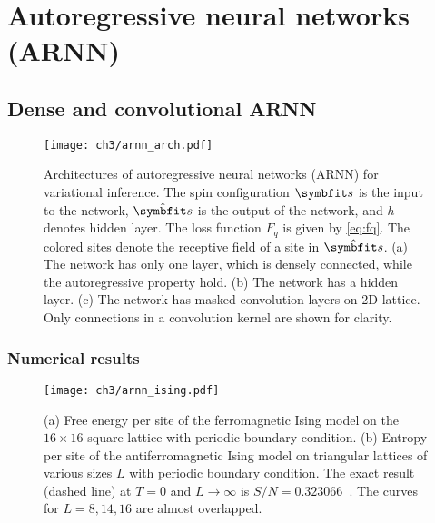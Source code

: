\chapter{Autoregressive neural networks (ARNN)}
\label{sec:arnn}

\section{Dense and convolutional ARNN}

\cite{wu2019solving}

\cite{nicoli2020asymptotically}

\cite{ciarella2023machine}

\begin{figure}[htb]
\centering
\texttt{[image: ch3/arnn\_arch.pdf]}
\caption[Architectures of autoregressive neural networks for variational inference]{
Architectures of autoregressive neural networks (ARNN) for variational inference.
The spin configuration $\vs$ is the input to the network, $\hat{\vs}$ is the output of the network, and $h$ denotes hidden layer. The loss function $F_q$ is given by \cref{eq:fq}. The colored sites denote the receptive field of a site in $\hat{\vs}$.
(a) The network has only one layer, which is densely connected, while the autoregressive property hold.
(b) The network has a hidden layer.
(c) The network has masked convolution layers on 2D lattice. Only connections in a convolution kernel are shown for clarity.
}
\label{fig:arnn-arch}
\end{figure}

\subsection{Numerical results}

\begin{figure}[htb]
\centering
\texttt{[image: ch3/arnn\_ising.pdf]}
\caption[ARNN results of Ising model on square and triangular lattices]{
(a) Free energy per site of the ferromagnetic Ising model on the $16 \times 16$ square lattice with periodic boundary condition.
(b) Entropy per site of the antiferromagnetic Ising model on triangular lattices of various sizes $L$ with periodic boundary condition.
The exact result (dashed line) at $T = 0$ and $L \to \infty$ is $S / N = 0.323066$~\cite{TODO}. The curves for $L = 8, 14, 16$ are almost overlapped.
}
\label{fig:arnn-ising}
\end{figure}

